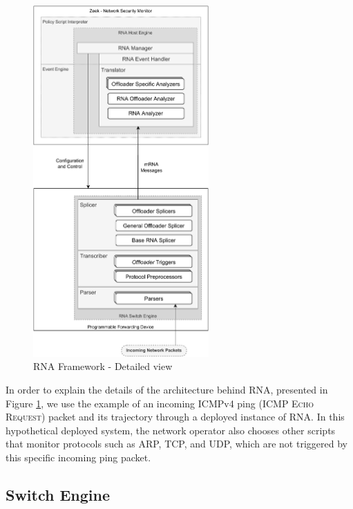\begin{figure}[H]
    \caption{RNA Framework - Detailed view}
    \begin{center}
        \includegraphics[width=0.6\textwidth]{images/arch_low_level.pdf}  
    \end{center}
    \label{fig:arch_low_level}
\end{figure}

In order to explain the details of the architecture behind RNA, presented in Figure \ref{fig:arch_low_level}, we use the example of an incoming ICMPv4 ping (\textsc{ICMP Echo Request}) packet and its trajectory through a deployed instance of RNA. In this hypothetical deployed system, the network operator also chooses other scripts that monitor protocols such as ARP, TCP, and UDP, which are not triggered by this specific incoming ping packet.

\subsection{Switch Engine}

